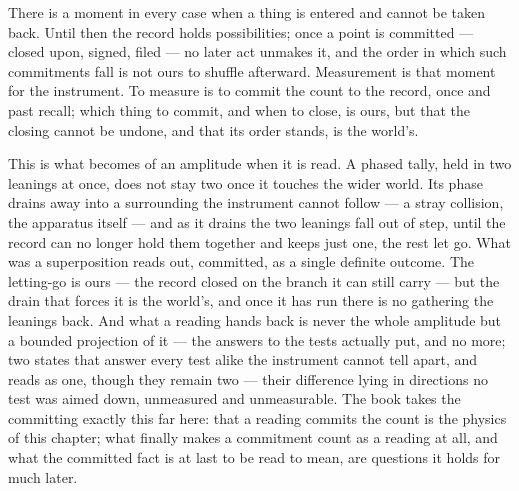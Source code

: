 \noindent There is a moment in every case when a thing is entered and cannot be taken back. Until then the
record holds possibilities; once a point is committed --- closed upon, signed, filed --- no later act unmakes
it, and the order in which such commitments fall is not ours to shuffle afterward. Measurement is that moment
for the instrument. To measure is to commit the count to the record, once and past recall; which thing to
commit, and when to close, is ours, but that the closing cannot be undone, and that its order stands, is the
world's.

This is what becomes of an amplitude when it is read. A phased tally, held in two leanings at once, does not
stay two once it touches the wider world. Its phase drains away into a surrounding the instrument cannot follow
--- a stray collision, the apparatus itself --- and as it drains the two leanings fall out of step, until the
record can no longer hold them together and keeps just one, the rest let go. What was a superposition reads out,
committed, as a single definite outcome. The letting-go is ours --- the record closed on the branch it can
still carry --- but the drain that forces it is the world's, and once it has run there is no gathering the
leanings back. And what a reading hands back is never the whole
amplitude but a bounded projection of it --- the answers to the tests actually put, and no more; two states that
answer every test alike the instrument cannot tell apart, and reads as one, though they remain two --- their
difference lying in directions no test was aimed down, unmeasured and unmeasurable. The book takes the committing exactly this far here: that a reading
commits the count is the physics of this chapter; what finally makes a commitment count as a reading at all, and
what the committed fact is at last to be read to mean, are questions it holds for much later.

